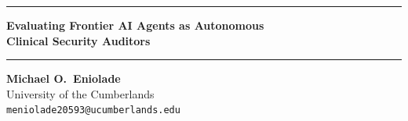 \documentclass[11pt]{article}
\begin{document}
{\par\noindent\rule{\linewidth}{3pt}\par}

\vspace{0.9em}

\begin{center}
  {\LARGE\bfseries Evaluating Frontier AI Agents as Autonomous\\[6pt]
   Clinical Security Auditors}
\end{center}

\vspace{0.45em}
\noindent\rule{\linewidth}{1pt}

\vspace{2em}

\begin{center}
  \textbf{Michael O.\ Eniolade}\\[5pt]
  University of the Cumberlands\\[4pt]
  \texttt{meniolade20593@ucumberlands.edu}
\end{center}
\end{document}
